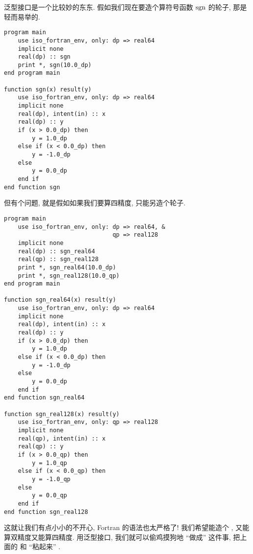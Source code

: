 泛型接口是一个比较妙的东东. 假如我们现在要造个算符号函数 $ \operatorname{sgn} $ 的轮子, 那是轻而易举的. 
\begin{lstlisting} 
program main
    use iso_fortran_env, only: dp => real64
    implicit none
    real(dp) :: sgn
    print *, sgn(10.0_dp)
end program main

function sgn(x) result(y)
    use iso_fortran_env, only: dp => real64
    implicit none
    real(dp), intent(in) :: x
    real(dp) :: y
    if (x > 0.0_dp) then
        y = 1.0_dp
    else if (x < 0.0_dp) then
        y = -1.0_dp
    else
        y = 0.0_dp
    end if
end function sgn
\end{lstlisting} 
但有个问题, 就是假如如果我们要算四精度, 只能另造个轮子. 
\begin{lstlisting} 
program main
    use iso_fortran_env, only: dp => real64, &
                               qp => real128
    implicit none
    real(dp) :: sgn_real64
    real(qp) :: sgn_real128
    print *, sgn_real64(10.0_dp)
    print *, sgn_real128(10.0_qp)
end program main

function sgn_real64(x) result(y)
    use iso_fortran_env, only: dp => real64
    implicit none
    real(dp), intent(in) :: x
    real(dp) :: y
    if (x > 0.0_dp) then
        y = 1.0_dp
    else if (x < 0.0_dp) then
        y = -1.0_dp
    else
        y = 0.0_dp
    end if
end function sgn_real64

function sgn_real128(x) result(y)
    use iso_fortran_env, only: qp => real128
    implicit none
    real(qp), intent(in) :: x
    real(qp) :: y
    if (x > 0.0_qp) then
        y = 1.0_qp
    else if (x < 0.0_qp) then
        y = -1.0_qp
    else
        y = 0.0_qp
    end if
end function sgn_real128
\end{lstlisting} 
这就让我们有点小小的不开心, Fortran 的语法也太严格了! 我们希望能造个 , 又能算双精度又能算四精度. 用泛型接口, 我们就可以偷鸡摸狗地 ``做成'' 这件事, 把上面的  和   ``粘起来'' . 
